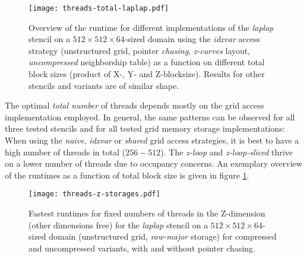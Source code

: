 \begin{figure}
	\begin{center}
    \texttt{[image: threads-total-laplap.pdf]}
	\end{center}
    \caption{\label{fig:blocksizes-overview} Overview of the runtime for different implementations of the \emph{laplap} stencil on a $512\times 512\times 64$-sized domain using the \emph{idxvar} access strategy (unstructured grid, pointer \emph{chasing}, \emph{z-curves} layout, \emph{uncompressed} neighborship table) as a function on different total block sizes (product of X-, Y- and Z-blocksize). Results for other stencils and variants are of similar shape.}
\end{figure}

The optimal \emph{total number} of threads depends mostly on the grid access implementation employed. In general, the same patterns can be observed for all three tested stencils and for all tested grid memory storage implementations: When using the \emph{naive}, \emph{idxvar} or \emph{shared} grid access strategies, it is best to have a high number of threads in total ($256-512$). The \emph{z-loop} and \emph{z-loop-sliced} thrive on a lower number of threads due to occupancy concerns. An exemplary overview of the runtimes as a function of total block size is given in figure \ref{fig:blocksizes-overview}.

\begin{figure}
	\begin{center}
    \texttt{[image: threads-z-storages.pdf]}
	\end{center}
    \caption{\label{fig:blocksizes-z}Fastest runtimes for fixed numbers of threads in the Z-dimension (other dimensions free) for the \emph{laplap} stencil on a $512\times 512\times 64$-sized domain (unstructured grid, \emph{row-major} storage) for compressed and uncompressed variants, with and without pointer chasing.}
\end{figure}

